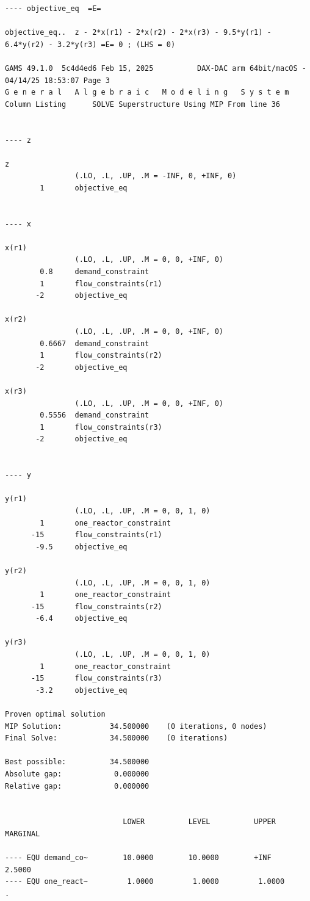 \documentclass[11pt]{article}
\begin{document}
\begin{verbatim}
---- objective_eq  =E=  

objective_eq..  z - 2*x(r1) - 2*x(r2) - 2*x(r3) - 9.5*y(r1) - 6.4*y(r2) - 3.2*y(r3) =E= 0 ; (LHS = 0)
     
GAMS 49.1.0  5c4d4ed6 Feb 15, 2025          DAX-DAC arm 64bit/macOS - 04/14/25 18:53:07 Page 3
G e n e r a l   A l g e b r a i c   M o d e l i n g   S y s t e m
Column Listing      SOLVE Superstructure Using MIP From line 36


---- z  

z
                (.LO, .L, .UP, .M = -INF, 0, +INF, 0)
        1       objective_eq


---- x  

x(r1)
                (.LO, .L, .UP, .M = 0, 0, +INF, 0)
        0.8     demand_constraint
        1       flow_constraints(r1)
       -2       objective_eq

x(r2)
                (.LO, .L, .UP, .M = 0, 0, +INF, 0)
        0.6667  demand_constraint
        1       flow_constraints(r2)
       -2       objective_eq

x(r3)
                (.LO, .L, .UP, .M = 0, 0, +INF, 0)
        0.5556  demand_constraint
        1       flow_constraints(r3)
       -2       objective_eq


---- y  

y(r1)
                (.LO, .L, .UP, .M = 0, 0, 1, 0)
        1       one_reactor_constraint
      -15       flow_constraints(r1)
       -9.5     objective_eq

y(r2)
                (.LO, .L, .UP, .M = 0, 0, 1, 0)
        1       one_reactor_constraint
      -15       flow_constraints(r2)
       -6.4     objective_eq

y(r3)
                (.LO, .L, .UP, .M = 0, 0, 1, 0)
        1       one_reactor_constraint
      -15       flow_constraints(r3)
       -3.2     objective_eq

Proven optimal solution
MIP Solution:           34.500000    (0 iterations, 0 nodes)
Final Solve:            34.500000    (0 iterations)

Best possible:          34.500000
Absolute gap:            0.000000
Relative gap:            0.000000


                           LOWER          LEVEL          UPPER         MARGINAL

---- EQU demand_co~        10.0000        10.0000        +INF            2.5000      
---- EQU one_react~         1.0000         1.0000         1.0000          .          


\end{verbatim}
\end{document}
